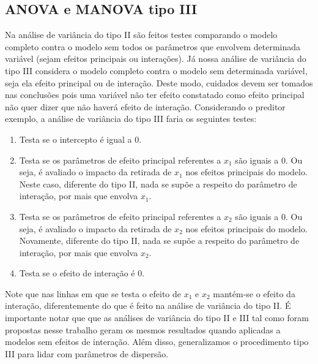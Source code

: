 \subsection{ANOVA e MANOVA tipo III}

Na análise de variância do tipo II são feitos testes comparando o modelo completo contra o modelo sem todos os parâmetros que envolvem determinada variável (sejam efeitos principais ou interações). Já nossa análise de variância do tipo III considera o modelo completo contra o modelo sem determinada variável, seja ela efeito principal ou de interação. Deste modo, cuidados devem ser tomados nas conclusões pois uma variável não ter efeito constatado como efeito principal não quer dizer que não haverá efeito de interação. Considerando o preditor exemplo, a análise de variância do tipo III faria os seguintes testes:

\begin{enumerate}
  \item Testa se o intercepto é igual a 0.
  
  \item Testa se os parâmetros de efeito principal referentes a $x_1$ são iguais a 0. Ou seja, é avaliado o impacto da retirada de $x_1$ nos efeitos principais do modelo. Neste caso, diferente do tipo II, nada se supõe a respeito do parâmetro de interação, por mais que envolva $x_1$.
  
  \item Testa se os parâmetros de efeito principal referentes a $x_2$ são iguais a 0. Ou seja, é avaliado o impacto da retirada de $x_2$ nos efeitos principais do modelo. Novamente, diferente do tipo II, nada se supõe a respeito do parâmetro de interação, por mais que envolva $x_2$.
  
  \item Testa se o efeito de interação é 0.
\end{enumerate}

Note que nas linhas em que se testa o efeito de $x_1$ e $x_2$ mantém-se o efeito da interação, diferentemente do que é feito na análise de variância do tipo II. É importante notar que que as análises de variância do tipo II e III tal como foram propostas nesse trabalho geram os mesmos resultados quando aplicadas a modelos sem efeitos de interação. Além disso, generalizamos o procedimento tipo III para lidar com parâmetros de dispersão.

